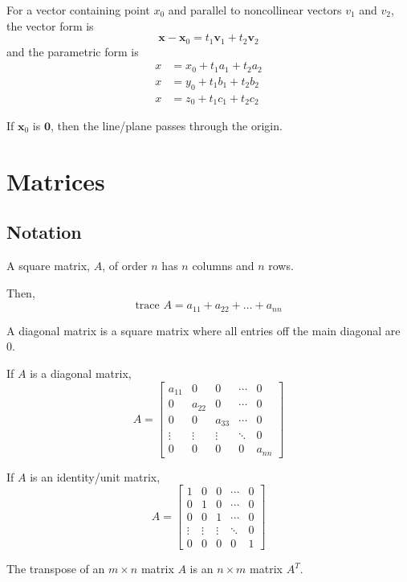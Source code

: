 \documentclass[../linear-algebra.tex]{subfiles}
\begin{document}
\noindent For a vector containing point $x_0$ and parallel to noncollinear vectors $v_1$ and $v_2$,
the vector form is 
\[\mathbf{x} - \mathbf{x}_0 = t_1\mathbf{v}_1 + t_2\mathbf{v}_2\]
and the parametric form is
\begin{align*}
    x &= x_0 + t_1a_1 + t_2a_2 \\
    x &= y_0 + t_1b_1 + t_2b_2 \\
    x &= z_0 + t_1c_1 + t_2c_2
\end{align*}

\noindent If $\mathbf{x}_0$ is $\mathbf{0}$, then the line/plane passes through the origin.

\newpage

\section{Matrices}
\subsection{Notation}
A square matrix, $A$, of order $n$ has $n$ columns and $n$ rows.

\noindent Then,
\[\text{trace } A = a_{11} + a_{22} + \ldots + a_{nn}\]

\noindent A diagonal matrix is a square matrix where all entries off the main
diagonal are 0.

\noindent If $A$ is a diagonal matrix,
\[A = \begin{bmatrix}
    a_{11} & 0 & 0 & \cdots & 0 \\
    0 & a_{22} & 0 & \cdots & 0 \\
    0 & 0 & a_{33} & \cdots & 0 \\
    \vdots & \vdots & \vdots & \ddots & 0\\
    0 & 0 & 0 & 0 & a_{nn}
\end{bmatrix}\]

\noindent If $A$ is an identity/unit matrix,
    \[A = \begin{bmatrix}
    1 & 0 & 0 & \cdots & 0 \\
    0 & 1 & 0 & \cdots & 0 \\
    0 & 0 & 1 & \cdots & 0 \\
    \vdots & \vdots & \vdots & \ddots & 0\\
    0 & 0 & 0 & 0 & 1
\end{bmatrix}\]

\noindent The transpose of an $m\times n$ matrix $A$ is an $n\times m$ matrix $A^T$.
\end{document}
